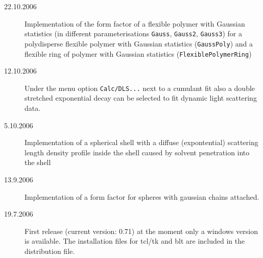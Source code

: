 \begin{description}
    \item[22.10.2006] Implementation of the form factor of a flexible polymer with Gaussian statistics
    (in different parameterisations \verb"Gauss", \verb"Gauss2", \verb"Gauss3") for a polydisperse flexible
    polymer with Gaussian statistics (\verb"GaussPoly") and a flexible ring of polymer with Gaussian statistics
    (\verb"FlexiblePolymerRing")
    \item[12.10.2006] Under the menu option \verb"Calc/DLS..." next to a cumulant fit also
      a double stretched exponential decay can be selected to fit dynamic light scattering data.
    \item[5.10.2006] Implementation of a spherical shell with a diffuse
      (expontential) scattering length density profile inside the shell
      caused by solvent penetration into the shell
    \item[13.9.2006] Implementation of a form factor for spheres
      with gaussian chains attached.
    \item[19.7.2006] First release (current version: 0.71)
      at the moment only a windows version is available. The
      installation files for tcl/tk and blt are included in the
      distribution file.
\end{description}
